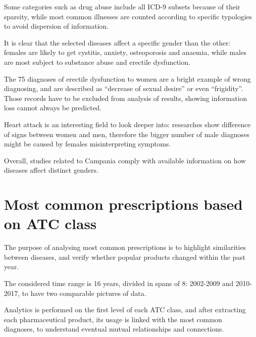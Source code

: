 Some categories such as drug abuse include all ICD-9 subsets because of their sparsity, while most common illnesses are counted according to specific typologies to avoid dispersion of information.

It is clear that the selected diseases affect a specific gender than the other: females are likely to get cystitis, anxiety, osteoporosis and anaemia, while males are most subject to substance abuse and erectile dysfunction.

The 75 diagnoses of erectile dysfunction to women are a bright example of wrong diagnosing, and are described as ``decrease of sexual desire'' or even ``frigidity''. Those records have to be excluded from analysis of results, showing information loss cannot always be predicted.

Heart attack is an interesting field to look deeper into: researches show difference of signs between women and men, therefore the bigger number of male diagnoses might be caused by females misinterpreting symptoms. 

Overall, studies related to Campania comply with available information on how diseases affect distinct genders.

\section[Most common prescriptions]{Most common prescriptions based on ATC class}
The purpose of analysing most common prescriptions is to highlight similarities between diseases, and verify whether popular products changed within the past year.

The considered time range is 16 years, divided in spans of 8: 2002-2009 and 2010-2017, to have two comparable pictures of data.

Analytics is performed on the first level of each ATC class, and after extracting each pharmaceutical product, its usage is linked with the most common diagnoses, to understand eventual mutual relationships and connections.

